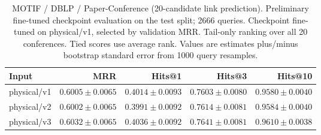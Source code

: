 \begin{table}[t]
\centering
\small
\begin{tabular}{lrrrr}
\toprule
Input & MRR & Hits@1 & Hits@3 & Hits@10 \\
\midrule
physical/v1 & $0.6005 \pm 0.0065$ & $0.4014 \pm 0.0093$ & $0.7603 \pm 0.0080$ & $0.9580 \pm 0.0040$ \\
physical/v2 & $0.6002 \pm 0.0065$ & $0.3991 \pm 0.0092$ & $0.7614 \pm 0.0081$ & $0.9584 \pm 0.0040$ \\
physical/v3 & $0.6032 \pm 0.0065$ & $0.4036 \pm 0.0092$ & $0.7641 \pm 0.0081$ & $0.9610 \pm 0.0038$ \\
\bottomrule
\end{tabular}
\caption{MOTIF / DBLP / Paper-Conference (20-candidate link prediction). Preliminary fine-tuned checkpoint evaluation on the test split; 2666 queries. Checkpoint fine-tuned on physical/v1, selected by validation MRR. Tail-only ranking over all 20 conferences. Tied scores use average rank. Values are estimates plus/minus bootstrap standard error from 1000 query resamples.}
\label{tab:motif-paper_conference-link_prediction}
\end{table}
